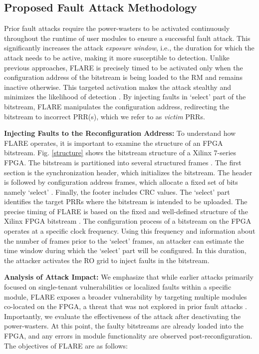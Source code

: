  \subsection{Proposed Fault Attack Methodology}
\vspace{-0.1cm}
 Prior fault attacks \cite{FPGAhammer, 8056840} require the power-wasters to be activated continuously throughout the runtime of user modules to ensure a successful  fault attack. This significantly increases the attack \textit{exposure window}, i.e., the duration for which the attack needs to be active, making it more susceptible to detection. Unlike previous approaches, FLARE is precisely timed to be activated only when the configuration address of the bitstream is being loaded to the RM and remains inactive otherwise. This targeted activation makes the attack stealthy and minimizes the likelihood of detection \cite{9643485, 10.1145/3451236}. By injecting faults in `select' part of the bitstream, FLARE manipulates the configuration address, redirecting the bitstream to incorrect PRR(s), which we refer to as \textit{victim} PRRs.
 
\textbf{Injecting Faults to the Reconfiguration Address:} To understand how FLARE operates, it is important to examine the structure of an FPGA bitstream. Fig. \ref{structure} shows the bitstream structure of a Xilinx 7-series FPGA. The bitstream is partitioned into several structured frames \cite{pham2017bitman}.  The first section is the synchronization header, which initializes the bitstream. The header is followed by configuration address frames, which allocate a fixed set of bits namely `select' \cite{9643485}. Finally, the footer includes CRC values. The `select' part identifies the target PRRs where the bitstream is intended to be uploaded. The precise timing of FLARE is based on the fixed and well-defined structure of the Xilinx FPGA bitstream \cite{9643485}. The configuration process of a bitstream on the FPGA operates at a specific clock frequency. Using this frequency and information about the number of frames prior to the `select' frames, an attacker can estimate the time window during which the `select' part will be configured. In this duration, the attacker activates the RO grid to inject faults in the bitstream. 
 
\textbf{Analysis of Attack Impact:} We emphasize that while earlier attacks primarily focused on single-tenant vulnerabilities or localized faults within a specific module, FLARE exposes a broader vulnerability by targeting multiple modules co-located on the FPGA, a threat that was not explored in prior fault attacks \cite{chaudhuri2024hackingfabrictargetingpartial, FPGAhammer, krautter2021remote, provelengios2020power}. Importantly, we evaluate the effectiveness of the attack after deactivating the power-wasters. At this point, the faulty bitstreams are already loaded into the FPGA, and any errors in module functionality are observed post-reconfiguration. The objectives of FLARE are as follows:

